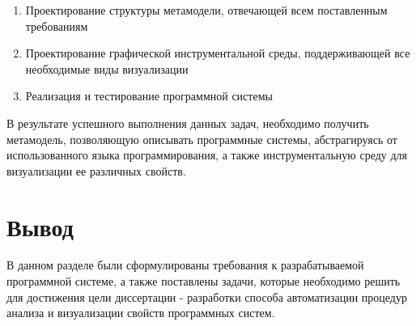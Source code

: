 \begin{enumerate}
    \item Проектирование структуры метамодели, отвечающей всем поставленным
    требованиям
    \item Проектирование графической инструментальной среды, поддерживающей все
    необходимые виды визуализации
    \item Реализация и тестирование программной системы
\end{enumerate}

В результате успешного выполнения данных задач, необходимо получить метамодель,
позволяющую описывать программные системы, абстрагируясь от использованного
языка программирования, а также инструментальную среду для визуализации ее
различных свойств.

\section{Вывод}

В данном разделе были сформулированы требования к разрабатываемой программной
системе, а также поставлены задачи, которые необходимо решить для достижения
цели диссертации - разработки способа автоматизации процедур анализа и
визуализации свойств программных систем.

